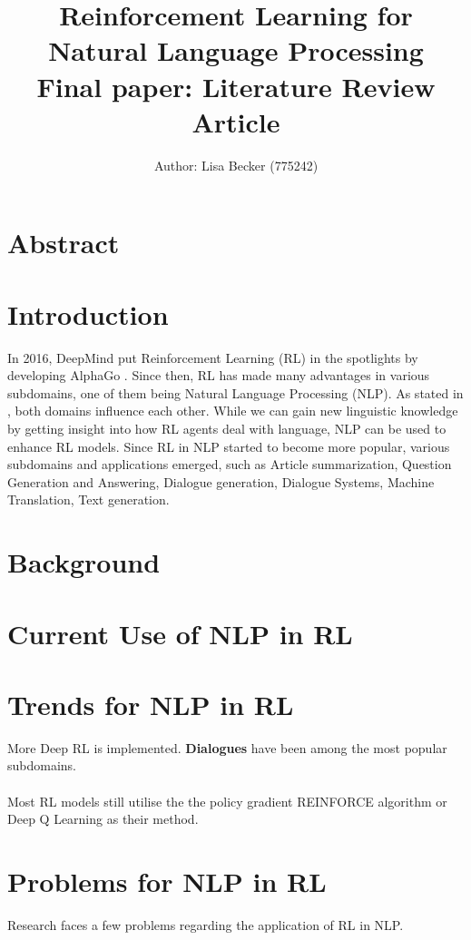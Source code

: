 \documentclass[11pt,a4paper]{article}
\title{{\LARGE Reinforcement Learning for Natural Language Processing}\\[1.5mm]
{\large Final paper: Literature Review Article}\\[1.5mm]}
\author{Author: Lisa Becker (775242) }
\begin{document}
\maketitle
\section{Abstract}


\section{Introduction}
In 2016, DeepMind put Reinforcement Learning (RL) in the spotlights by developing AlphaGo \citep{alphago}. Since then, RL has made many advantages in various subdomains, one of them being Natural Language Processing (NLP). As stated in \citet{ijcai2019}, both domains influence each other. While we can gain new linguistic knowledge by getting insight into how RL agents deal with language, NLP can be used to enhance RL models. Since RL in NLP started to become more popular, various subdomains and applications emerged, such as Article summarization, Question Generation and Answering, Dialogue generation, Dialogue Systems, Machine Translation, Text generation.

\section{Background}

\section{Current Use of NLP in RL}


\section{Trends for NLP in RL}
More Deep RL is implemented. 
\textbf{Dialogues} have been among the most popular subdomains.\\\\ 
Most RL models still utilise the the policy gradient REINFORCE algorithm or Deep Q Learning as their method.

\section{Problems for NLP in RL}
Research faces a few problems regarding the application of RL in NLP. 
\end{document}
